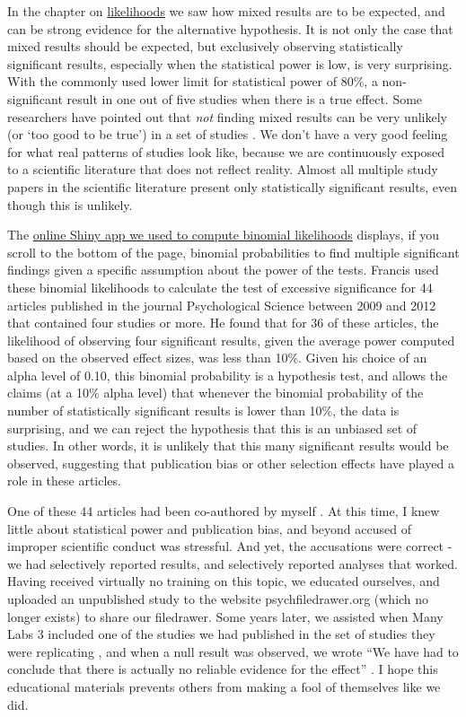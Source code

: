 \documentclass[
  oneside]{book}
\begin{document}
In the chapter on \protect\hyperlink{likelihoods}{likelihoods} we saw how mixed results are to be expected, and can be strong evidence for the alternative hypothesis. It is not only the case that mixed results should be expected, but exclusively observing statistically significant results, especially when the statistical power is low, is very surprising. With the commonly used lower limit for statistical power of 80\%, a non-significant result in one out of five studies when there is a true effect. Some researchers have pointed out that \emph{not} finding mixed results can be very unlikely (or `too good to be true') in a set of studies \citep{francis_frequency_2014, schimmack_ironic_2012}. We don't have a very good feeling for what real patterns of studies look like, because we are continuously exposed to a scientific literature that does not reflect reality. Almost all multiple study papers in the scientific literature present only statistically significant results, even though this is unlikely.

The \href{http://shiny.ieis.tue.nl/mixed_results_likelihood/}{online Shiny app we used to compute binomial likelihoods} displays, if you scroll to the bottom of the page, binomial probabilities to find multiple significant findings given a specific assumption about the power of the tests. Francis \citep{francis_frequency_2014} used these binomial likelihoods to calculate the test of excessive significance \citep{ioannidis_exploratory_2007} for 44 articles published in the journal Psychological Science between 2009 and 2012 that contained four studies or more. He found that for 36 of these articles, the likelihood of observing four significant results, given the average power computed based on the observed effect sizes, was less than 10\%. Given his choice of an alpha level of 0.10, this binomial probability is a hypothesis test, and allows the claims (at a 10\% alpha level) that whenever the binomial probability of the number of statistically significant results is lower than 10\%, the data is surprising, and we can reject the hypothesis that this is an unbiased set of studies. In other words, it is unlikely that this many significant results would be observed, suggesting that publication bias or other selection effects have played a role in these articles.

One of these 44 articles had been co-authored by myself \citep{jostmann_weight_2009}. At this time, I knew little about statistical power and publication bias, and beyond accused of improper scientific conduct was stressful. And yet, the accusations were correct - we had selectively reported results, and selectively reported analyses that worked. Having received virtually no training on this topic, we educated ourselves, and uploaded an unpublished study to the website psychfiledrawer.org (which no longer exists) to share our filedrawer. Some years later, we assisted when Many Labs 3 included one of the studies we had published in the set of studies they were replicating \citep{ebersole_many_2016}, and when a null result was observed, we wrote ``We have had to conclude that there is actually no reliable evidence for the effect'' \citep{jostmann_short_2016}. I hope this educational materials prevents others from making a fool of themselves like we did.
\end{document}
